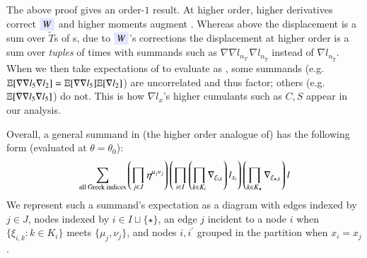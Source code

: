     The above proof gives an order-$1$ result.  %
At higher order, higher derivatives correct
${\translucent{moosky}{$W$}}$
and higher
moments augment
.
%
%
Whereas above the displacement is a sum over $\tilde T$s of
s, due to ${\translucent{moosky}{$W$}}$'s
corrections the displacement at higher order is a sum over \emph{tuples} of
times with summands such as $\nabla\nabla l_{n_{T^\prime}} \nabla l_{n_{\tilde
T}}$ instead of $\nabla l_{n_{\tilde T}}$.
%
When we then take expectations of  to evaluate 
 as  
,
some summands (e.g.\ $\mathbb{E}[\nabla\nabla l_{5}
\nabla l_{2}]=\mathbb{E}[\nabla\nabla l_{5}]
\mathbb{E}[\nabla l_{2}]$) are uncorrelated and thus factor; others (e.g.\ $\mathbb{E}[\nabla\nabla
l_{5} \nabla l_{5}]$) do not.  This is how $\nabla l_x$'s higher cumulants such
as $C, S$ appear in our analysis.
%
    \label{sect:diagrams-in-brief}

  Overall, a general summand in (the higher order analogue of)  has the following form (evaluated at $\theta=\theta_0$):
$$
    \sum_{\text{all Greek indices}} \left(\prod_{j\in J} \eta^{\mu_j\nu_j}\right)
    \left(\prod_{i\in I} \left(\prod_{k\in K_i} \nabla_{\xi_{i,k}}\right)
    l_{x_i}\right) \left(\prod_{k\in K_\star} \nabla_{\xi_{\star,k}}\right)
    l
$$
We represent such a summand's expectation as a diagram with
edges indexed by $j\in J$, nodes
indexed by $i\in I\sqcup \{\star\}$, an edge $j$ incident
to a node $i$ when $\{\xi_{i,k}:k\in K_i\}$ meets
$\{\mu_j,\nu_j\}$, and nodes $i,i^\prime$ grouped in the partition when
$x_i=x_j$.





